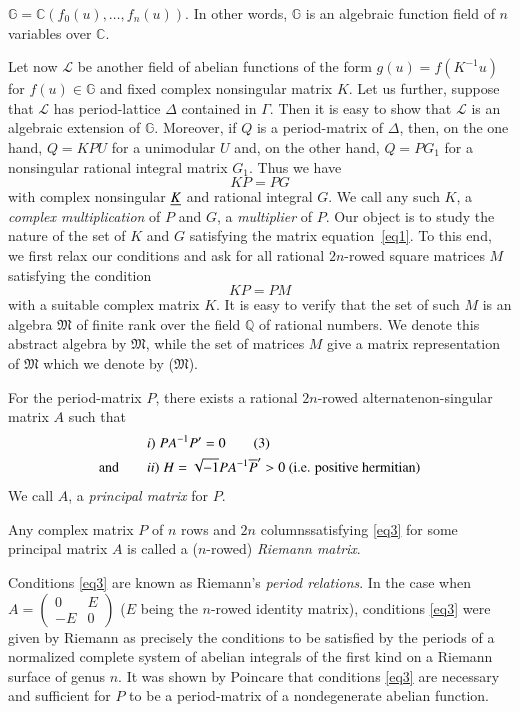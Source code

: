 $\mathbb{G}=\mathbb{C} (f_0(u), \ldots, f_n(u))$. In other words,
$\mathbb{G}$ is an algebraic function field of $n$ variables over
$\mathbb{C}$. 

Let now $\mathscr{L}$ be another field of abelian functions of the form
$g(u)=f(K^{-1}u)$ for $f(u)\in\mathbb{G}$ and fixed complex
nonsingular matrix $K$. Let us further, suppose that $\mathscr{L}$ has
period-lattice $\Delta$ contained in $\Gamma$. Then it is easy to show
that $\mathscr{L}$ is an algebraic extension of
$\mathbb{G}$. Moreover, if $Q$ is a period-matrix of $\Delta$, then,
on the one hand, $Q=KPU$ for a unimodular $U$ and, on the other hand,
$Q=PG_1$ for a nonsingular rational integral matrix $G_1$. Thus we
have
\begin{equation*}
K P=PG \tag{1}\label{eq1}
\end{equation*}
with complex nonsingular $\underline{K}$ and rational integral $G$. We call
any such $K$, a {\em complex multiplication} of $P$ and $G$, a
{\em multiplier} of $P$. Our object is to study the nature of the
set of $K$ and $G$ satisfying the matrix equation~\eqref{eq1}. To this end, we
first relax our conditions and ask for all rational $2n$-rowed square
matrices $M$ satisfying the condition
\begin{equation*}
K P = P M \tag{2}\label{eq2}
\end{equation*}
with a suitable complex matrix $K$. It is easy to verify that the set
of such $M$ is an algebra $\mathfrak{M}$ of finite rank over the field
$\mathbb{Q}$ of rational numbers. We denote this abstract algebra by
$\mathfrak{M}$, while the set of matrices $M$ give a matrix
representation of $\mathfrak{M}$ which we denote by ($\mathfrak{M}$).

For the period-matrix $P$, there exists a rational $2n$-rowed
alternate\pageoriginale non-singular matrix $A$ such that
\begin{align*}
& i) \; P A^{-1} P' = 0\tag{3}\label{eq3}\\
{\rm and}\qquad  & ii) \; H = \sqrt{-1} P A^{-1} \overline{P}' >0 \text{
  (i.e. positive hermitian)}
\end{align*}
We call $A$, a {\em principal matrix} for $P$.

\begin{defi*}
Any complex matrix $P$ of $n$ rows and $2n$ columns\break satisfying \eqref{eq3} for
some principal matrix $A$ is called a ($n$-rowed) {\em Riemann
  matrix}. 
\end{defi*}

Conditions \eqref{eq3} are known as Riemann's {\em period relations}. In
the case when $A=\left(\begin{smallmatrix} 0 & E \\ -E &
  0 \end{smallmatrix} \right)$ ($E$ being the $n$-rowed identity
matrix), conditions \eqref{eq3} were given by Riemann \cite{16} as precisely the
conditions to be satisfied by the periods of a normalized complete
system of abelian integrals of the first kind on a Riemann surface of
genus $n$. It was shown by Poincare that conditions \eqref{eq3} are necessary
and sufficient for $P$ to be a period-matrix of a nondegenerate
abelian function.

